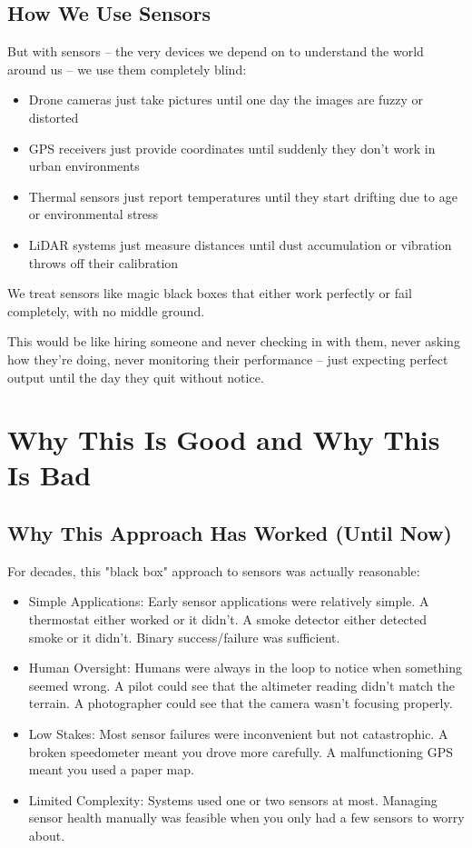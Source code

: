 \documentclass[11pt,letterpaper]{article}
\begin{document}
\subsection*{How We Use Sensors}

But with sensors – the very devices we depend on to understand the world around us – we use them completely blind:
\begin{itemize}[leftmargin=10pt, itemsep=1pt]
    \item Drone cameras just take pictures until one day the images are fuzzy or distorted
    \item GPS receivers just provide coordinates until suddenly they don't work in urban environments
    \item Thermal sensors just report temperatures until they start drifting due to age or environmental stress
    \item LiDAR systems just measure distances until dust accumulation or vibration throws off their calibration
\end{itemize}

We treat sensors like magic black boxes that either work perfectly or fail completely, with no middle ground.

This would be like hiring someone and never checking in with them, never asking how they're doing, never monitoring their performance – just expecting perfect output until the day they quit without notice.

\section*{Why This Is Good and Why This Is Bad}

\subsection*{Why This Approach Has Worked (Until Now)}

For decades, this "black box" approach to sensors was actually reasonable:
\begin{itemize}[leftmargin=10pt, itemsep=1pt]
    \item Simple Applications: Early sensor applications were relatively simple. A thermostat either worked or it didn't. A smoke detector either detected smoke or it didn't. Binary success/failure was sufficient.
    \item Human Oversight: Humans were always in the loop to notice when something seemed wrong. A pilot could see that the altimeter reading didn't match the terrain. A photographer could see that the camera wasn't focusing properly.
    \item Low Stakes: Most sensor failures were inconvenient but not catastrophic. A broken speedometer meant you drove more carefully. A malfunctioning GPS meant you used a paper map.
    \item Limited Complexity: Systems used one or two sensors at most. Managing sensor health manually was feasible when you only had a few sensors to worry about.
\end{itemize}
\end{document}
